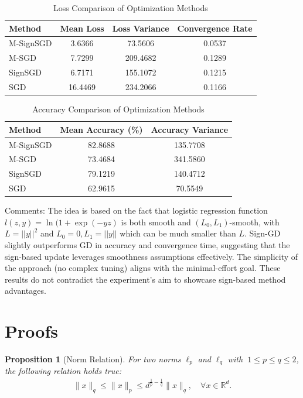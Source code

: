 \documentclass[12pt]{article}
\newcommand{\R}{\mathbb{R}}
\newtheorem{proposition}{Proposition}
\begin{document}
\begin{table}[H]
\centering
\caption{Loss Comparison of Optimization Methods}
\begin{tabular}{lccc}
\toprule
\textbf{Method} & \textbf{Mean Loss} & \textbf{Loss Variance} & \textbf{Convergence Rate} \\
\midrule
M-SignSGD & 3.6366 & 73.5606 & 0.0537 \\
M-SGD     & 7.7299 & 209.4682 & 0.1289 \\
SignSGD   & 6.7171 & 155.1072 & 0.1215 \\
SGD       & 16.4469 & 234.2066 & 0.1166 \\
\bottomrule
\end{tabular}
\end{table}

\begin{table}[H]
\centering
\caption{Accuracy Comparison of Optimization Methods}
\begin{tabular}{lcc}
\toprule
\textbf{Method} & \textbf{Mean Accuracy (\%)} & \textbf{Accuracy Variance} \\
\midrule
M-SignSGD & 82.8688 & 135.7708 \\
M-SGD     & 73.4684 & 341.5860 \\
SignSGD   & 79.1219 & 140.4712 \\
SGD       & 62.9615 & 70.5549 \\
\bottomrule
\end{tabular}
\end{table}


Comments: 
The idea is based on the fact that logistic regression function $l(z,y) = \ln (1 + \exp(-yz)$  is both smooth and $(L_0, L_1)$-smooth, with $L = || y ||^2$ and $L_0 = 0, L_1 = || y ||$ which can be much smaller than $L$. Sign-GD slightly outperforms GD in accuracy and convergence time, suggesting that the sign-based update leverages smoothness assumptions effectively. The simplicity of the approach (no complex tuning) aligns with the minimal-effort goal. These results do not contradict the experiment’s aim to showcase sign-based method advantages.



\printbibliography

\newpage
\section{Proofs}

\begin{proposition}[Norm Relation]
    For two norms $ \ell_p$ and $\ell_q$ with $\ 1 \leq p \leq q \leq 2$, the following relation holds true:
    \begin{eqnarray}
        \|x\|_q \leq \|x\|_p \leq d^{\frac{1}{p} - \frac{1}{q}}\|x\|_q, \quad \forall x \in \R^d. \label{eq: norm relation}
    \end{eqnarray}
\end{proposition}
\end{document}
